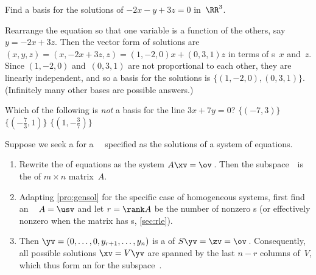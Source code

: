 \begin{example} 
Find a basis for the solutions of \(-2x-y+3z=0\) in~\(\RR^3\).
\begin{solution} 
Rearrange the equation so that one variable is a function of the others, say \(y=-2x+3z\).
Then the vector form of solutions are \((x,y,z)=(x,-2x+3z,z)=(1,-2,0)x+(0,3,1)z\) in terms of s~\(x\) and~\(z\).
Since \((1,-2,0)\) and~\((0,3,1)\) are not proportional to each other, they are linearly independent, and so a basis for the solutions is \(\{(1,-2,0),(0,3,1)\}\).
(Infinitely many other bases are possible answers.)
\end{solution}
\end{example}



\begin{activity}
Which of the following is \emph{not} a basis for the line \(3x+7y=0\)?
{\(\{(-7,3)\}\)}
{\(\{(-\frac73,1)\}\)}
{\(\{(1,-\frac37)\}\)}
\end{activity}





\begin{procedure} \label{pro:bfe}
Suppose we seek a  for a ~\WW\ specified as the solutions of a system of equations.
\begin{enumerate}
\item Rewrite the  of equations as the  system \(A\xv=\ov\)\,. 
Then the subspace~\WW\ is the  of \(m\times n\) matrix~\(A\).
\item  Adapting \cref{pro:gensol} for the specific case of homogeneous systems, first find an \svd\  \(A=\usv\) and let \(r=\rank A\) be the number of nonzero s (or effectively nonzero when the matrix has s, \cref{sec:rle}).
\item Then \(\yv=(0,\ldots,0,y_{r+1},\ldots,y_n)\) is a  of \(S\yv=\zv=\ov\)\,.
Consequently, all possible solutions \(\xv=V\yv\) are spanned by the last \(n-r\) columns of~\(V\), which thus form an  for the subspace~\WW.
\end{enumerate}
\end{procedure}


